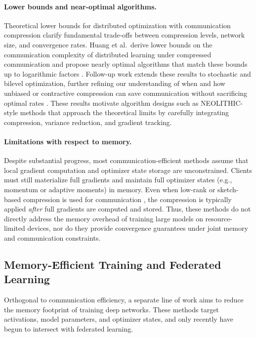 \paragraph{Lower bounds and near-optimal algorithms.}
Theoretical lower bounds for distributed optimization with communication compression clarify fundamental trade-offs between compression levels, network size, and convergence rates. Huang et al.\ derive lower bounds on the communication complexity of distributed learning under compressed communication and propose nearly optimal algorithms that match these bounds up to logarithmic factors \cite{he2022lowerbounds}. Follow-up work extends these results to stochastic and bilevel optimization, further refining our understanding of when and how unbiased or contractive compression can save communication without sacrificing optimal rates \cite{he2023lowerboundsStoch,he2024distributedBilevel}. These results motivate algorithm designs such as NEOLITHIC-style methods that approach the theoretical limits by carefully integrating compression, variance reduction, and gradient tracking.

\paragraph{Limitations with respect to memory.}
Despite substantial progress, most communication-efficient methods assume that local gradient computation and optimizer state storage are unconstrained. Clients must still materialize full gradients and maintain full optimizer states (e.g., momentum or adaptive moments) in memory. Even when low-rank or sketch-based compression is used for communication \cite{alistarh2017qsgd,li2019sketchedsgd,basu2019qsparselocal}, the compression is typically applied \emph{after} full gradients are computed and stored. Thus, these methods do not directly address the memory overhead of training large models on resource-limited devices, nor do they provide convergence guarantees under joint memory and communication constraints.

\subsection{Memory-Efficient Training and Federated Learning}

Orthogonal to communication efficiency, a separate line of work aims to reduce the memory footprint of training deep networks. These methods target activations, model parameters, and optimizer states, and only recently have begun to intersect with federated learning.

